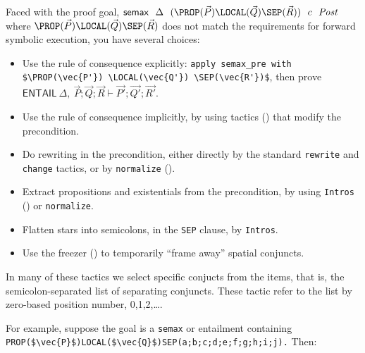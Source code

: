 \documentclass[12pt,fleqn,openany,oneside,showtrims]{memoir}
\begin{document}
Faced with the proof goal,\hfill
$\mathsf{semax}~~\Delta~~(\PROP(\vec{P}) \LOCAL(\vec{Q}) \SEP(\vec{R}))~~c~~\mathit{Post}$
where $\PROP(\vec{P}) \LOCAL(\vec{Q}) \SEP(\vec{R})$ does not match
the requirements for forward symbolic execution,
you have several choices:
\begin{itemize}
\item Use the rule of consequence explicitly:\newline
\lstinline|apply semax_pre with $\PROP(\vec{P'}) \LOCAL(\vec{Q'}) \SEP(\vec{R'})$|,\newline
then prove $\mathsf{ENTAIL}~\Delta,~\vec{P};\vec{Q};\vec{R}\vdash\vec{P'};\vec{Q'};\vec{R'}$.
\item Use the rule of consequence implicitly,
by using tactics () that modify the precondition.
\item Do rewriting in the precondition, either directly by the
standard \lstinline{rewrite} and \lstinline{change} tactics,
or by \lstinline{normalize} ().
\item Extract propositions and existentials from the precondition,
by using \lstinline{Intros} ()
or \lstinline{normalize}.
\item Flatten stars into semicolons, in the \lstinline{SEP} clause,
 by \lstinline{Intros}.
\item Use the freezer () to temporarily ``frame away'' spatial conjuncts.
\end{itemize}

\newpage
{}
\label{refcard:manip}
In many of these tactics we select specific conjucts from the
\SEP{} items, that is, the semicolon-separated list of
separating conjuncts.  These tactic refer to the list
by zero-based position number, 0,1,2,\ldots.

For example, suppose the goal is a \lstinline{semax}
or entailment containing \lstinline|PROP($\vec{P}$)LOCAL($\vec{Q}$)SEP(a;b;c;d;e;f;g;h;i;j).|
Then:
\end{document}
